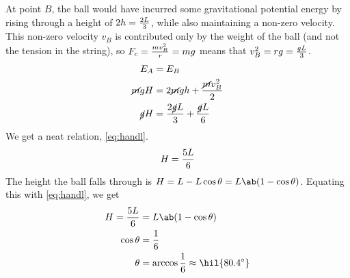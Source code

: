 At point \(B\), the ball would have incurred some gravitational
potential energy by rising through a height of \(2h=\frac{2L}{3}\),
while also maintaining a non-zero velocity. This non-zero velocity
\(v_B\) is contributed only by the weight of the ball (and not the
tension in the string), so \(F_c = \frac{mv_B^2}{r} = mg\) means that
\(v_B^2 = rg = \frac{gL}{3}\).
\begin{align*}
  E_A &= E_B\\
  \cancel{m}gH &= 2\cancel{m}gh + \frac{\cancel{m}v_B^2}{2} \\
  \cancel{g}H &= \frac{2\cancel{g}L}{3} + \frac{\cancel{g}L}{6}
\end{align*}
We get a neat relation, \cref{eq:handl}.
\begin{equation}
  \label{eq:handl}
  H = \frac{5L}{6}
\end{equation}
The height the ball falls through is \(H = L - L\cos\theta =
L\ab(1-\cos\theta)\). Equating this with \cref{eq:handl}, we get
\begin{align*}
  H = \f{5L}{6} &= L\ab(1-\cos\theta) \\
  \cos\theta &= \f{1}{6} \\
  \theta &= \arccos\f{1}{6} \approx \hil{\qty{80.4}{\degree}}
\end{align*}
